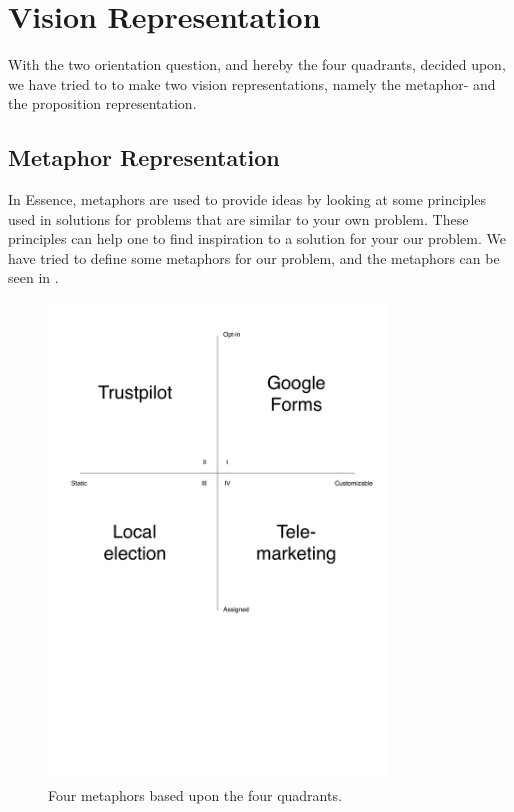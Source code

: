 
\section{Vision Representation}
\label{sec:vision_representation}


With the two orientation question, and hereby the four quadrants, decided upon, we have tried to to make two vision representations, namely the metaphor- and the proposition representation.

\subsection{Metaphor Representation}
\label{sub:metaphor_representation}

In Essence, metaphors are used to provide ideas by looking at some principles used in solutions for problems that are similar to your own problem. These principles can help one to find inspiration to a solution for your our problem. We have tried to define some metaphors for our problem, and the metaphors can be seen in .

\begin{figure}[!htbp]
	\centering
	\includegraphics[width=0.8\textwidth]{graphic/problem_analysis/vision/metaphor.pdf}
	\caption{Four metaphors based upon the four quadrants.}
	\label{fig:metaphor}
\end{figure}
\FloatBarrier

